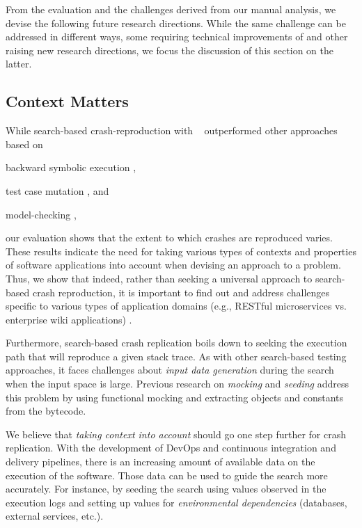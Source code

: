 
From the evaluation and the challenges derived from our manual analysis, we devise the following future research directions. 
While the same challenge can be addressed in different ways, some requiring technical improvements of \evocrash and other raising new research directions, we focus the discussion of this section on the latter. 

\subsection{Context Matters}

While search-based crash-reproduction with \evocrash~\cite{soltani2017,Soltani2018a} outperformed other approaches based on \begin{inparaenum}[(i)]
\item backward symbolic execution \cite{Chen2015},
\item test case mutation \cite{Xuan2015},
and \item model-checking \cite{Nayrolles2017},
\end{inparaenum}
our evaluation shows that the extent to which crashes are reproduced varies.
These results indicate the need for taking various types of contexts and properties of software applications into account when devising an approach to a problem.
Thus, we show that indeed, rather than seeking a universal approach to search-based crash reproduction, it is important to find out and address challenges specific to various types of application domains (e.g., RESTful microservices vs. enterprise wiki applications) \cite{Arcuri2017b}.

Furthermore, search-based crash replication boils down to seeking the execution path that will reproduce a given stack trace.
As with other search-based testing approaches, it faces challenges about \emph{input data generation} during the search when the input space is large.
Previous research on \textit{mocking} and \textit{seeding} \cite{arcuri2017private,Rojas2016} address this problem by using functional mocking and extracting objects and constants from the bytecode.

We believe that \emph{taking context into account} should go one step further for crash replication.
With the development of DevOps \cite{Roche2013} and continuous integration and delivery pipelines, there is an increasing amount of available data on the execution of the software.
Those data can be used to guide the search more accurately.
For instance, by seeding the search using values observed in the execution logs and setting up values for \emph{environmental dependencies} (databases, external services, etc.).


